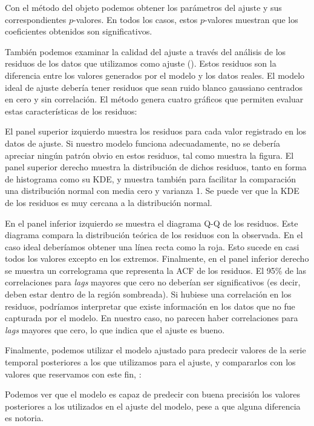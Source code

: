 Con el método  del objeto  podemos obtener los parámetros del ajuste y sus correspondientes $p$-valores. En todos los casos, estos $p$-valores muestran que los coeficientes obtenidos son significativos.

También podemos examinar la calidad del ajuste a través del análisis de los residuos de los datos que utilizamos como ajuste (). Estos residuos son la diferencia entre los valores generados por el modelo y los datos reales. El modelo ideal de ajuste debería tener residuos que sean ruido blanco gaussiano centrados en cero y sin correlación. El método  genera cuatro gráficos que permiten evaluar estas características de los residuos:

El panel superior izquierdo muestra los residuos para cada valor registrado en los datos de ajuste. Si nuestro modelo funciona adecuadamente, no se debería apreciar ningún patrón obvio en estos residuos, tal como muestra la figura. El panel superior derecho muestra la distribución de dichos residuos, tanto en forma de histograma como su KDE, y muestra también para facilitar la comparación una distribución normal con media cero y varianza 1. Se puede ver que la KDE de los residuos es muy cercana a la distribución normal.

En el panel inferior izquierdo se muestra el diagrama Q-Q de los residuos. Este diagrama compara la distribución teórica de los residuos con la observada. En el caso ideal deberíamos obtener una línea recta como la roja. Esto sucede en casi todos los valores excepto en los extremos. Finalmente, en el panel inferior derecho se muestra un correlograma que representa la ACF de los residuos. El 95\% de las correlaciones para \textit{lags} mayores que cero no deberían ser significativos (es decir, deben estar dentro de la región sombreada). Si hubiese una correlación en los residuos, podríamos interpretar que existe información en los datos que no fue capturada por el modelo. En nuestro caso, no parecen haber correlaciones para \textit{lags} mayores que cero, lo que indica que el ajuste es bueno.

Finalmente, podemos utilizar el modelo ajustado para predecir valores de la serie temporal posteriores a los que utilizamos para el ajuste, y compararlos con los valores que reservamos con este fin, :

Podemos ver que el modelo es capaz de predecir con buena precisión los valores posteriores a los utilizados en el ajuste del modelo, pese a que alguna diferencia es notoria.

